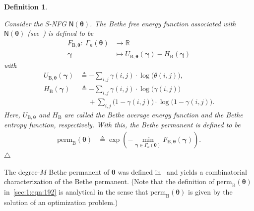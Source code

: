 \documentclass[journal,lettersize,twocolumn]{IEEEtran} %
\newtheorem{definition}[theorem]{Definition}
\newcommand{\edefinition}{\hfill$\triangle$}
\newcommand{\vect}[1]{ \bm{#1} }
\newcommand{\vgam}{ \vect{\gamma} }
\newcommand{\sfN}{ \mathsf{N} }
\newcommand{\sR}{\mathbb{R}}
\newcommand{\matr}[1]{ \bm{#1} }
\newcommand{\defeq}{ \triangleq }
\newcommand{\permb}{ \mathrm{perm}_{\mathrm{B}} }
\newcommand{\mtheta}{\matr{\theta}}
\newcommand{\vtheta}{\matr{\theta}}
\newcommand{\FBthe}{F_{ \mathrm{B}, \mtheta }}
\newcommand{\UBthe}{U_{ \mathrm{B}, \mtheta }}
\newcommand{\HBthe}{H_{ \mathrm{B} }}
\newcommand{\Gamnthe}{ \Gamma_{n}(\vtheta) }
\begin{document}
\begin{definition}
  \label{sec:1:def:16}
    
  Consider the S-NFG $ \sfN(\mtheta) $. The Bethe free energy function
  associated with $ \sfN(\mtheta) $ (see~\cite[Corollary 15]{Vontobel2013a})
  is defined to be 
  \begin{align*}
    \FBthe: \ \Gamma_{n}(\mtheta) &\to \sR \\
              \vgam              &\mapsto \UBthe( \vgam ) - \HBthe( \vgam )
  \end{align*}
  with
  \begin{align*}
    \UBthe(\vgam)
      &\defeq
        -\sum_{ i,j }
        \gamma(i,j) \cdot \log\bigl( \theta(i,j) \bigr), \\
    \HBthe( \vgam )
      &\defeq 
        -
        \sum_{ i,j }
          \gamma(i,j) \cdot \log\bigl(  \gamma(i,j) \bigr) \\
      &\quad\ 
        + 
        \sum_{ i,j }
          \bigl( 1 - \gamma(i,j) \bigr) 
            \cdot 
            \log\bigl( 1 - \gamma(i,j) \bigr).
  \end{align*}
  Here, $ \UBthe $ and $ \HBthe $ are called the Bethe average energy function
  and the Bethe entropy function, respectively. With this, the Bethe permanent
  is defined to be
  \begin{align}
    \permb(\mtheta)
      &\defeq 
         \exp
           \left(
             - \min_{\vgam \in \Gamnthe} \FBthe( \vgam ) 
           \right).
        \label{sec:1:eqn:192}
  \end{align}
  \edefinition
\end{definition}

%

The degree-$M$ Bethe permanent of $\mtheta$ was defined
in~\cite{Vontobel2013a} and yields a combinatorial characterization of the
Bethe permanent. (Note that the definition of $\permb(\mtheta)$
in~\eqref{sec:1:eqn:192} is analytical in the sense that $\permb(\mtheta)$ is
given by the solution of an optimization problem.)

%
\end{document}
